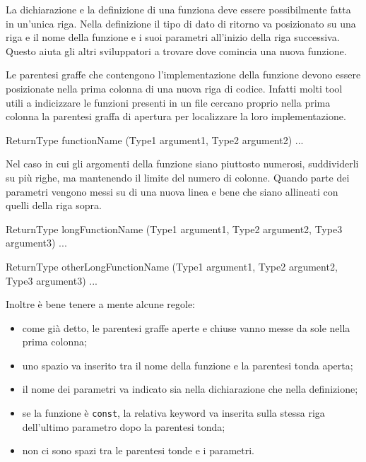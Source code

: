 La dichiarazione e la definizione di una funziona deve essere possibilmente fatta in un'unica riga.
Nella definizione il tipo di dato di ritorno va posizionato su una riga e il nome della funzione e i suoi parametri all'inizio della riga successiva.
Questo aiuta gli altri sviluppatori a trovare dove comincia una nuova funzione.

Le parentesi graffe che contengono l'implementazione della funzione devono essere posizionate nella prima colonna di una nuova riga di codice.
Infatti molti tool utili a indicizzare le funzioni presenti in un file cercano proprio nella prima colonna la parentesi graffa di apertura per localizzare la loro implementazione.

\begin{minipage}[t]{\rbwidth}
\begin{RightCode}
ReturnType
functionName (Type1 argument1, Type2 argument2)
{
  ...
}
\end{RightCode}
\end{minipage}%

Nel caso in cui gli argomenti della funzione siano piuttosto numerosi, suddividerli su più righe, ma mantenendo il limite del numero di colonne.
Quando parte dei parametri vengono messi su di una nuova linea e bene che siano allineati con quelli della riga sopra.

\begin{minipage}[t]{\rbwidth}
\begin{RightCode}
ReturnType
longFunctionName (Type1 argument1, Type2 argument2,
                  Type3 argument3)
{
  ...
}

ReturnType
otherLongFunctionName (Type1 argument1,
                       Type2 argument2,
                       Type3 argument3)
{
  ...
}
\end{RightCode}
\end{minipage}%

Inoltre è bene tenere a mente alcune regole:
\begin{itemize}
	\item come già detto, le parentesi graffe aperte e chiuse vanno messe da sole nella prima colonna;
	\item uno spazio va inserito tra il nome della funzione e la parentesi tonda aperta;
	\item il nome dei parametri va indicato sia nella dichiarazione che nella definizione;
	\item se la funzione è \texttt{const}, la relativa keyword va inserita sulla stessa riga dell'ultimo parametro dopo la parentesi tonda;
	\item non ci sono spazi tra le parentesi tonde e i parametri.
\end{itemize}

